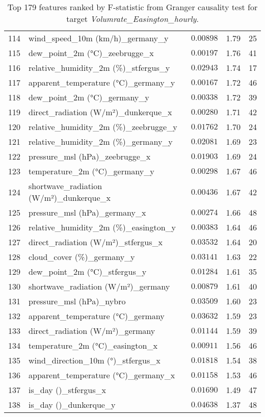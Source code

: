 \begin{table}[H]
\begin{tabular}{r l l l l}
        114 & wind\_speed\_10m (km/h)\_germany\_y & $0.00898$ & 1.79 & 25 \\
        115 & dew\_point\_2m (°C)\_zeebrugge\_x & $0.00197$ & 1.76 & 41 \\
        116 & relative\_humidity\_2m (\%)\_stfergus\_y & $0.02943$ & 1.74 & 17 \\
        117 & apparent\_temperature (°C)\_germany\_y & $0.00167$ & 1.72 & 46 \\
        118 & dew\_point\_2m (°C)\_germany\_y & $0.00338$ & 1.72 & 39 \\
        119 & direct\_radiation (W/m²)\_dunkerque\_x & $0.00280$ & 1.71 & 42 \\
        120 & relative\_humidity\_2m (\%)\_zeebrugge\_y & $0.01762$ & 1.70 & 24 \\
        121 & relative\_humidity\_2m (\%)\_germany\_y & $0.02081$ & 1.69 & 23 \\
        122 & pressure\_msl (hPa)\_zeebrugge\_x & $0.01903$ & 1.69 & 24 \\
        123 & temperature\_2m (°C)\_germany\_y & $0.00298$ & 1.67 & 46 \\
        124 & shortwave\_radiation (W/m²)\_dunkerque\_x & $0.00436$ & 1.67 & 42 \\
        125 & pressure\_msl (hPa)\_germany\_x & $0.00274$ & 1.66 & 48 \\
        126 & relative\_humidity\_2m (\%)\_easington\_y & $0.00383$ & 1.64 & 46 \\
        127 & direct\_radiation (W/m²)\_stfergus\_x & $0.03532$ & 1.64 & 20 \\
        128 & cloud\_cover (\%)\_germany\_y & $0.03141$ & 1.63 & 22 \\
        129 & dew\_point\_2m (°C)\_stfergus\_y & $0.01284$ & 1.61 & 35 \\
        130 & shortwave\_radiation (W/m²)\_germany & $0.00879$ & 1.61 & 40 \\
        131 & pressure\_msl (hPa)\_nybro & $0.03509$ & 1.60 & 23 \\
        132 & apparent\_temperature (°C)\_germany & $0.03632$ & 1.59 & 23 \\
        133 & direct\_radiation (W/m²)\_germany & $0.01144$ & 1.59 & 39 \\
        134 & temperature\_2m (°C)\_easington\_x & $0.00911$ & 1.56 & 46 \\
        135 & wind\_direction\_10m (°)\_stfergus\_x & $0.01818$ & 1.54 & 38 \\
        136 & apparent\_temperature (°C)\_germany\_x & $0.01158$ & 1.53 & 46 \\
        137 & is\_day ()\_stfergus\_x & $0.01690$ & 1.49 & 47 \\
        138 & is\_day ()\_dunkerque\_y & $0.04638$ & 1.37 & 48 \\
        \hline
    \end{tabular}
    \caption{Top 179 features ranked by F-statistic from Granger causality test for target \textit{Volumrate\_Easington\_hourly}.}
    \label{tab:granger_Easington_fstat}
\end{table}